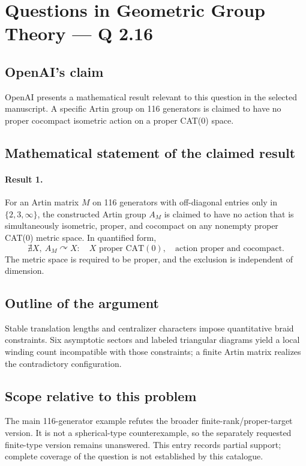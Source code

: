 \documentclass[11pt]{article}
\begin{document}
\section*{Questions in Geometric Group Theory — Q 2.16}

\subsection{OpenAI's claim}
OpenAI presents a mathematical result relevant to this question in the selected manuscript. A specific Artin group on 116 generators is claimed to have no proper cocompact isometric action on a proper CAT(0) space.

\subsection{Mathematical statement of the claimed result}
\paragraph{Result 1.} For an Artin matrix \(M\) on 116 generators with off-diagonal entries only in \(\{2,3,\infty\}\), the constructed Artin group \(A_M\) is claimed to have no action that is simultaneously isometric, proper, and cocompact on any nonempty proper CAT(0) metric space. In quantified form,
\[
 \nexists X,\ A_M\curvearrowright X:\quad
 X\text{ proper CAT}(0),\quad\text{action proper and cocompact}.
\]
The metric space is required to be proper, and the exclusion is independent of dimension.

\subsection{Outline of the argument}
Stable translation lengths and centralizer characters impose quantitative braid constraints. Six asymptotic sectors and labeled triangular diagrams yield a local winding count incompatible with those constraints; a finite Artin matrix realizes the contradictory configuration.

\subsection{Scope relative to this problem}
The main 116-generator example refutes the broader finite-rank/proper-target version. It is not a spherical-type counterexample, so the separately requested finite-type version remains unanswered. This entry records partial support; complete coverage of the question is not established by this catalogue.
\end{document}
